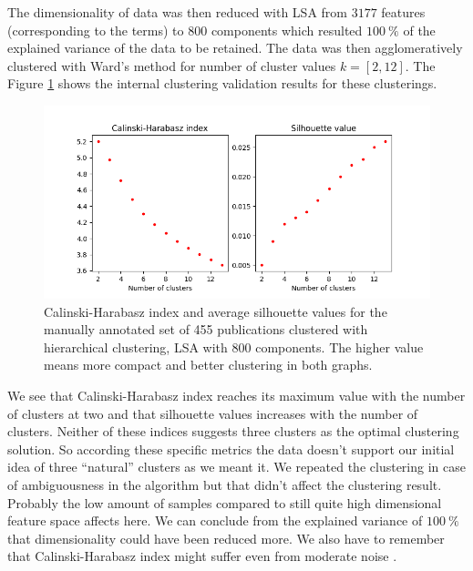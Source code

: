 The dimensionality of data was then reduced with LSA from $3177$
features (corresponding to the terms) to $800$ components which 
resulted $100\ \%$ of the explained variance of the data to be 
retained. The data was then agglomeratively clustered with Ward's 
method for number of cluster values $k=[2,12]$. 
The Figure \ref{fig:ch-silh01} shows the internal clustering 
validation results for these clusterings. 
\begin{figure}[ht]
  \begin{center}    
\includegraphics[width=11.5cm]{images/c-h-silh-index-plot-455-2_12-800-hierarchical.png}
    \caption{Calinski-Harabasz index and average silhouette values for the
    manually annotated set of 455 publications clustered with 
    hierarchical clustering, LSA with 800 components. The higher 
    value means more compact and better clustering in both 
    graphs.}
    \label{fig:ch-silh01}
    \end{center}
\end{figure}
We see that Calinski-Harabasz index reaches its maximum value 
with the number of clusters at two and that silhouette values 
increases with the number of clusters.
Neither of these indices suggests three clusters as the optimal 
clustering solution. So according these specific metrics the data 
doesn't support our initial idea of three ``natural'' clusters as
we meant it. We repeated the clustering in case of ambiguousness
in the algorithm but that didn't affect the clustering result.
Probably the low amount of samples compared to 
still quite high dimensional feature space affects here. We can 
conclude from the explained variance of $100\ \%$ that dimensionality
could have been reduced more. We also 
have to remember that Calinski-Harabasz index might suffer even 
from moderate noise \cite{liu_understanding_2010}.

